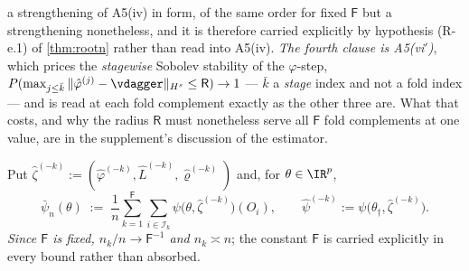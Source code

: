 \begin{definition}
\begin{enumerate}
{a strengthening of A5(iv) in form}, of the same order for fixed $\mathsf F$ but a strengthening
nonetheless, and it is therefore carried explicitly by hypothesis (R-e.1) of \cref{thm:rootn} rather
than read into A5(iv).
\emph{The fourth clause is A5(vi$'$)}, which prices the \emph{stagewise} Sobolev stability of the
$\varphi$-step,
$P(\max_{j\le\bar k}\|\hat\varphi^{(j)}-\vdagger\|_{H^{s}}\le\mathsf R)\to1$ --- $\bar k$ a
\emph{stage} index and not a fold index --- and is read at each fold complement exactly as the other
three are. What that costs, and why the radius $\mathsf R$ must nonetheless serve all $\mathsf F$ fold
complements at one value, are in the supplement's discussion of the estimator.
\end{enumerate}
Put $\hat\zeta^{(-k)}:=(\hat\varphi^{(-k)},\hat L^{(-k)},\hat\varrho^{(-k)})$ and, for $\theta\in\IR^{p}$,
\begin{equation}\label{eq:barpsi}
\bar\psi_n(\theta)\;:=\;\frac1n\sum_{k=1}^{\mathsf F}\sum_{i\in\mathcal I_k}\psi\big(\theta,\hat\zeta^{(-k)}\big)(O_i),
\qquad
\hat\psi^{(-k)}:=\psi\big(\theta_\dagger,\hat\zeta^{(-k)}\big).
\end{equation}
\emph{Since $\mathsf F$ is fixed, $n_k/n\to\mathsf F^{-1}$ and $n_k\asymp n$}; the constant $\mathsf F$
is carried explicitly in every bound rather than absorbed.
\end{definition}

